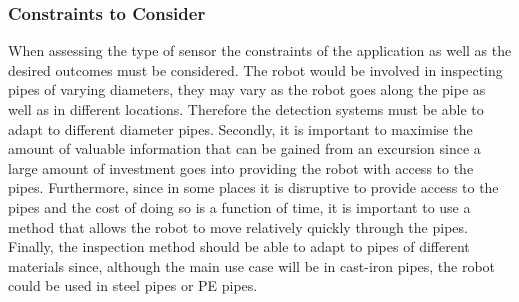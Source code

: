 \documentclass[11pt]{article}		%
\begin{document}
	        \subsubsection{Constraints to Consider}
	        
	        When assessing the type of sensor the constraints of the application as well as the desired outcomes must be considered. 
	        The robot would be involved in inspecting pipes of varying diameters, they may vary as the robot goes along the pipe as well as in different locations. 
	        Therefore the detection systems must be able to adapt to different diameter pipes. 
	        Secondly, it is important to maximise the amount of valuable information that can be gained from an excursion since a large amount of investment goes into providing the robot with access to the pipes.
	        Furthermore, since in some places it is disruptive to provide access to the pipes and the cost of doing so is a function of time, it is important to use a method that allows the robot to move relatively quickly through the pipes. 
	        Finally, the inspection method should be able to adapt to pipes of different materials since, although the main use case will be in cast-iron pipes, the robot could be used in steel pipes or PE pipes. 
	
\end{document}
